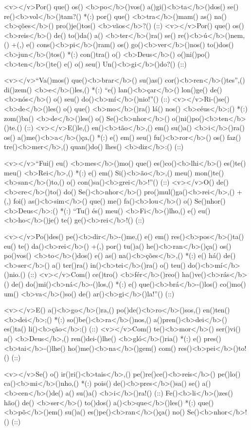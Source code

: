 <v></v>Por() que() os() <b>po</b>()vos() a()gi()<b>ta</b>()dos() se() re()<b>vol</b>()tam?() *(:)
por() que() <b>tra</b>()mam() as() na()<b>ções</b>() pro()je()tos() <b>vãos</b>?() (::)
<v></v>Por() que() os() <b>reis</b>() de() to()da() a() <b>ter</b>()ra() se() re()<b>ú</b>()nem,() +(,)
e() cons()<b>pi</b>()ram() os() go()<b>ver</b>()nos() to()dos() <b>jun</b>()tos() *(:)
con()tra() o() <b>Deus</b>() o()ni()po()<b>ten</b>()te() e() o() seu() Un()<b>gi</b>()do?() (::)

<v></v>``Va()mos() que()<b>brar</b>() su()as() cor()<b>ren</b>()tes'',() di()zem() <b>e</b>()les,() *(:)
``e() lan()<b>çar</b>() lon()ge() de() <b>nós</b>() o() seu() do()<b>mí</b>()nio!''() (::)
<v></v>Ri-()se() <b>de</b>()les() o() que() <b>mo</b>()ra() lá() nos() <b>céus</b>;() *(:)
zom()ba() <b>de</b>()les() o() Se()<b>nhor</b>() o()ni()po()<b>ten</b>()te.() (::)
<v></v>E()le,() en()<b>tão</b>,() em() su()a() <b>i</b>()ra() os() a()me()<b>a</b>()ça,() *(:)
e() em() seu() fu()<b>ror</b>() os() faz() tre()<b>mer</b>,() quan()do() lhes() <b>diz</b>:() (::)

<v></v>``Fui() eu() <b>mes</b>()mo() que() es()co()<b>lhi</b>() es()te() meu() <b>Rei</b>,() *(:)
e() em() Si()<b>ão</b>,() meu() mon()te() <b>san</b>()to,() o() con()sa()<b>grei</b>!''() (::)
<v></v>O() de()<b>cre</b>()to() do() Se()<b>nhor</b>() pro()mul()ga()<b>rei</b>,() +(,)
foi() as()<b>sim</b>() que() me() fa()<b>lou</b>() o() Se()nhor() <b>Deus</b>:() *(:)
``Tu() és() meu() <b>Fi</b>()lho,() e() eu() <b>ho</b>()je() te() ge()<b>rei</b>!() (::)

<v></v>Po()des() pe()<b>dir</b>-()me,() e() em() res()<b>pos</b>()ta() eu() te() da()<b>rei</b>() +(,)
por() tu()a() he()<b>ran</b>()ça() os() po()vos() <b>to</b>()dos() e() as() na()<b>ções</b>,() *(:)
e() há() de() <b>ser</b>() a() ter()ra() in()<b>tei</b>()ra() o() teu() do()<b>mí</b>()nio.() (::)
<v></v>Com() ce()tro() <b>fér</b>()reo() ha()ve()<b>rás</b>() de() do()mi()<b>ná</b>-()los,() *(:)
e() que()<b>brá</b>-()los() co()mo() um() <b>va</b>()so() de() ar()<b>gi</b>()la!''() (::)

<v></v>E() a()<b>go</b>()ra,() po()de()<b>ro</b>()sos,() en()ten()<b>dei</b>;() *(:)
so()be()<b>ra</b>()nos,() a()pren()<b>dei</b>() es()ta() li()<b>ção</b>:() (::)
<v></v>Com() te()<b>mor</b>() ser()vi() a() <b>Deus</b>,() ren()dei-()lhe() <b>gló</b>()ria() *(:)
e() pres()<b>tai</b>-()lhe() ho()me()<b>na</b>()gem() com() res()<b>pei</b>()to!() (::)

<v></v>Se() o() ir()ri()<b>tais</b>,() pe()re()ce()<b>reis</b>() pe()lo() ca()<b>mi</b>()nho,() *(:)
pois() de()<b>pres</b>()sa() se() a()<b>cen</b>()de() a() su()a() <b>i</b>()ra!() (::)
Fe()<b>li</b>()zes() hão() de() <b>ser</b>() to()dos() a()<b>que</b>()les() *(:)
que() <b>põ</b>()em() su()a() es()pe()<b>ran</b>()ça() no() Se()<b>nhor</b>!() (::)